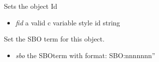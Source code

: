 \documentclass[a4paper,11pt,english]{sphinxmanual}
\begin{document}
\begin{fulllineitems}
\begin{fulllineitems}
\begin{itemize}
\end{itemize}

\end{fulllineitems}


\begin{fulllineitems}
\label{modules_doc:cbmpy.CBModel.Fbase.setPid}
Sets the object Id
\begin{itemize}
\item {} 
\emph{fid} a valid c variable style id string

\end{itemize}

\end{fulllineitems}


\begin{fulllineitems}
\label{modules_doc:cbmpy.CBModel.Fbase.setSBOterm}
Set the SBO term for this object.
\begin{itemize}
\item {} 
\emph{sbo} the SBOterm with format: SBO:nnnnnnn''

\end{itemize}

\end{fulllineitems}


\end{fulllineitems}

\end{document}
